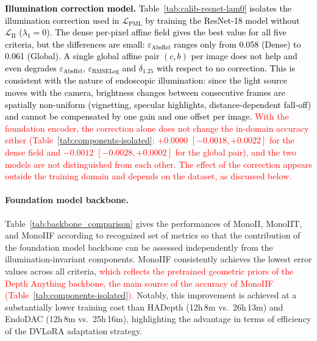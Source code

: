\documentclass[a4paper,fleqn]{cas-dc}
\begin{document}
{\noindent\textcolor{black}{{\bf Illumination correction model.}
Table~\ref{tab:calib-resnet-lam0} isolates the illumination correction used in $\mathcal{L}_\textrm{PML}$ by training the ResNet-18 model without $\mathcal{L}_\textrm{II}$ ($\lambda_1=0$). The dense per-pixel affine field gives the best value for all five criteria, but the differences are small: $\varepsilon_\textrm{AbsRel}$ ranges only from 0.058 (Dense) to 0.061 (Global). A single global affine pair $(c,b)$ per image does not help and even degrades $\varepsilon_\textrm{AbsRel}$, $\varepsilon_\textrm{RMSELog}$ and $\delta_{1.25}$ with respect to no correction. This is consistent with the nature of endoscopic illumination: since the light source moves with the camera, brightness changes between consecutive frames are spatially non-uniform (vignetting, specular highlights, distance-dependent fall-off) and cannot be compensated by one gain and one offset per image.
\textcolor{red}{With the foundation encoder, the correction alone does not change the in-domain accuracy either (Table~\ref{tab:components-isolated}: $+0.0000$ $[-0.0018, +0.0022]$ for the dense field and $-0.0012$ $[-0.0028, +0.0002]$ for the global pair), and the two models are not distinguished from each other. The effect of the correction appears outside the training domain and depends on the dataset, as discussed below.}}
%
\paragraph{Foundation model backbone.}

Table~\ref{tab:backbone_comparison} gives the performances of MonoII, MonoIIT, and MonoIIF according to recognized set of metrics so that the contribution of the foundation model backbone can be  assessed independently from the illumination-invariant components. MonoIIF consistently achieves the lowest error values across all criteria, \textcolor{red}{which reflects the pretrained geometric priors of the Depth Anything backbone, the main source of the accuracy of MonoIIF (Table~\ref{tab:components-isolated}).} Notably, this improvement is achieved at a substantially lower training cost than HADepth (12h\,8m vs.\ 26h\,13m) and EndoDAC (12h\,8m vs.\ 25h\,16m), highlighting the  advantage in terms of efficiency of the DVLoRA adaptation strategy.
\vspace*{1mm} \\

%
\textcolor{black}
{
}}
\end{document}
